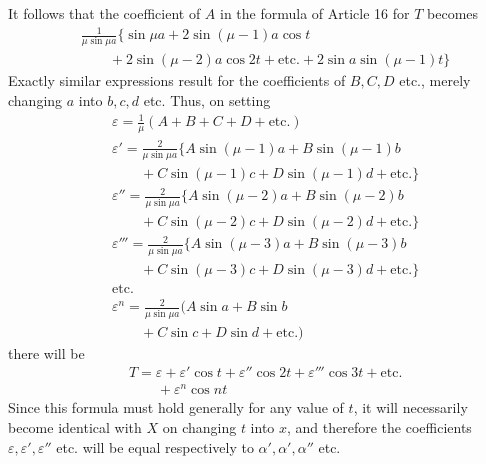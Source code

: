 It follows that the coefficient of $A$ in the formula of Article 16 for $T$ becomes
\[
\begin{aligned}
&\frac1{\mu\sin\mu a}\{\sin\mu a+2\sin(\mu-1)a\cos t\\[5pt]
&\qquad{}+2\sin(\mu-2)a\cos2t+\text{etc.}+2\sin a\sin(\mu-1)t\}
\end{aligned}
\]
Exactly similar expressions result for the coefficients of $B,C,D$ etc., merely changing $a$ into $b,c,d$ etc. Thus, on setting
\[
\begin{aligned}
&\varepsilon=\frac1\mu(A+B+C+D+\text{etc.})\\[5pt]
&\varepsilon'=\frac2{\mu\sin\mu a}\{A\sin(\mu-1)a+B\sin(\mu-1)b\\[5pt]
&\qquad{}+C\sin(\mu-1)c+D\sin(\mu-1)d+\text{etc.}\}\\[5pt]
&\varepsilon''=\frac2{\mu\sin\mu a}\{A\sin(\mu-2)a+B\sin(\mu-2)b\\[5pt]
&\qquad{}+C\sin(\mu-2)c+D\sin(\mu-2)d+\text{etc.}\}\\[5pt]
&\varepsilon'''=\frac2{\mu\sin\mu a}\{A\sin(\mu-3)a+B\sin(\mu-3)b\\[5pt]
&\qquad{}+C\sin(\mu-3)c+D\sin(\mu-3)d+\text{etc.}\}\\[5pt]
&\text{etc.}\\[5pt]
&\varepsilon^{n}=\frac2{\mu\sin\mu a}(A\sin a+B\sin b\\[5pt]
&\qquad{}+C\sin c+D\sin d+\text{etc.})
\end{aligned}
\]
there will be
\[
\begin{aligned}
&T=\varepsilon+\varepsilon'\cos t+\varepsilon''\cos2t+\varepsilon'''\cos3t+\text{etc.}\\[5pt]
&\qquad{}+\varepsilon^{n}\cos nt
\end{aligned}
\]
Since this formula must hold generally for any value of $t$, it will necessarily become identical with $X$ on changing $t$ into $x$, and therefore the coefficients $\varepsilon,\varepsilon',\varepsilon''$ etc. will be equal respectively to $\alpha',\alpha',\alpha''$ etc.
\endgroup
